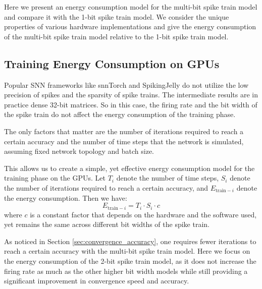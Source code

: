     Here we present an energy consumption model for the multi-bit spike train model and compare it with the 1-bit spike train model. We consider the unique properties of various hardware implementations and give the energy consumption of the multi-bit spike train model relative to the 1-bit spike train model. 

    \subsection{Training Energy Consumption on GPUs}
    \label{subsec:training_energy}
        Popular SNN frameworks like snnTorch and SpikingJelly do not utilize the low precision of spikes and the sparsity of spike trains. The intermediate results are in practice dense 32-bit matrices. So in this case, the firing rate and the bit width of the spike train do not affect the energy consumption of the training phase. 
    
        The only factors that matter are the number of iterations required to reach a certain accuracy and the number of time steps that the network is simulated, assuming fixed network topology and batch size. 
    
        This allows us to create a simple, yet effective energy consumption model for the training phase on the GPUs. Let $T_i$ denote the number of time steps, $S_i$ denote the number of iterations required to reach a certain accuracy, and $E_{\text{train}-i}$ denote the energy consumption. Then we have:
        \begin{equation}
            E_{\text{train}-i} = T_i \cdot S_i \cdot c
        \end{equation}
        where $c$ is a constant factor that depends on the hardware and the software used, yet remains the same across different bit widths of the spike train. 
    
        As noticed in Section \ref{sec:convergence_accuracy}, one requires fewer iterations to reach a certain accuracy with the multi-bit spike train model. Here we focus on the energy consumption of the 2-bit spike train model, as it does not increase the firing rate as much as the other higher bit width models while still providing a significant improvement in convergence speed and accuracy. 

